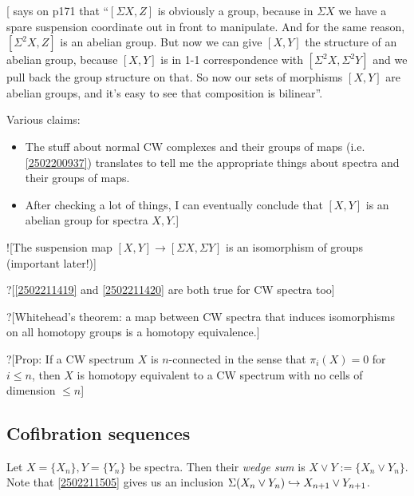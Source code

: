 \documentclass{MetricNotes2023}
\def\inj{\ensuremath\hookrightarrow}
\begin{document}
[\autocite{stable_homotopy} says on p171 that ``\([\Sigma X, Z]\) is obviously a group, because in \(\Sigma X\) we have a spare suspension coordinate out in front to manipulate. And for the same reason, \([\Sigma^2 X, Z]\) is an abelian group. But now we can give \([X,Y]\) the structure of an abelian group, because \([X,Y]\) is in 1-1 correspondence with \([\Sigma^2X, \Sigma^2 Y]\) and we pull back the group structure on that. So now our sets of morphisms \([X,Y]\) are abelian groups, and it's easy to see that composition is bilinear''. 

Various claims:
\begin{itemize}

\item The stuff about normal CW complexes and their groups of maps (i.e. \ref{2502200937}) translates to tell me the appropriate things about spectra and their groups of maps.
\item After checking a lot of things, I can eventually conclude that \([X, Y]\) is an abelian group for spectra \(X, Y\).]
\end{itemize}

![The suspension map \([X,Y]\to[\Sigma X, \Sigma Y]\) is an isomorphism of groups (important later!)]

?[\ref{2502211419} and \ref{2502211420} are both true for CW spectra too]

?[Whitehead's theorem: a map between CW spectra that induces isomorphisms on all homotopy groups is a homotopy equivalence.]

?[Prop: If a CW spectrum \(X\) is \(n\)-connected in the sense that \(\pi_i(X)=0\) for \(i\leq n\), then \(X\) is homotopy equivalent to a CW spectrum with no cells of dimension \(\leq n\)]

\subsection{Cofibration sequences}\label{2503291211}

\begin{definition}
Let \(X=\{X_n\}, Y=\{Y_n\}\) be spectra. Then their \textit{wedge sum} %
 is \(X\vee Y :=\{X_n \vee Y_n\}\). Note that \ref{2502211505} gives us an inclusion \(\Sigma(X_n\vee Y_n)\inj X_{n+1}\vee Y_{n+1}\). 
\end{definition}
\end{document}
